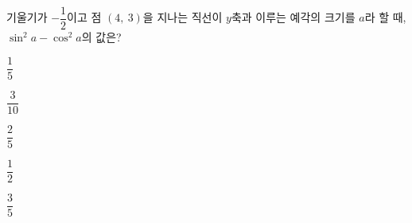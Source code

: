 기울기가 $-\dfrac{1}{2}$이고 점 $(4,\ 3)$을 지나는 직선이 $y$축과 이루는 예각의 크기를 $a$라 할 때, $\sin^2 a-\cos^2 a$의 값은?
\begin{choices32}{\rule[-3ex]{0pt}{8ex}$\dfrac{1}{5}$}{\rule[-3ex]{0pt}{8ex}$\dfrac{3}{10}$}{\rule[-3ex]{0pt}{8ex}$\dfrac{2}{5}$}{\rule[-3ex]{0pt}{8ex}$\dfrac{1}{2}$}{\rule[-3ex]{0pt}{8ex}$\dfrac{3}{5}$}\end{choices32}
